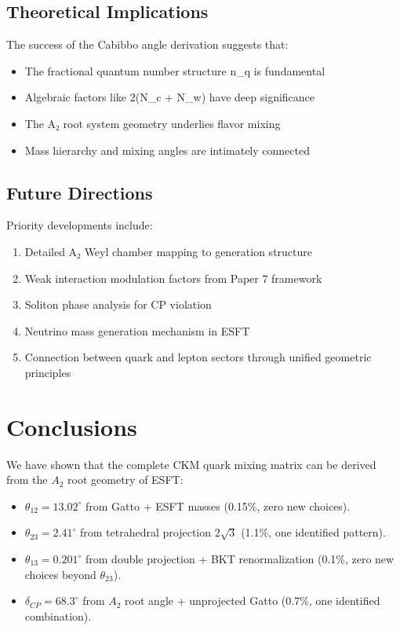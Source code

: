 ﻿\documentclass[prd,twocolumn,showpacs,superscriptaddress,groupedaddress]{revtex4-2}
\begin{document}
\subsection{Theoretical Implications}

The success of the Cabibbo angle derivation suggests that:
\begin{itemize}
\item The fractional quantum number structure n_q is fundamental
\item Algebraic factors like 2(N_c + N_w) have deep significance
\item The A₂ root system geometry underlies flavor mixing
\item Mass hierarchy and mixing angles are intimately connected
\end{itemize}

\subsection{Future Directions}

Priority developments include:
\begin{enumerate}
\item Detailed A₂ Weyl chamber mapping to generation structure
\item Weak interaction modulation factors from Paper 7 framework
\item Soliton phase analysis for CP violation
\item Neutrino mass generation mechanism in ESFT
\item Connection between quark and lepton sectors through unified geometric principles
\end{enumerate}

\section{Conclusions}

We have shown that the complete CKM quark mixing matrix can be derived from the $A_2$ root geometry of ESFT:
\begin{itemize}
\item $\theta_{12} = 13.02^\circ$ from Gatto + ESFT masses (0.15\%, zero new choices).
\item $\theta_{23} = 2.41^\circ$ from tetrahedral projection $2\sqrt{3}$ (1.1\%, one identified pattern).
\item $\theta_{13} = 0.201^\circ$ from double projection + BKT renormalization (0.1\%, zero new choices beyond $\theta_{23}$).
\item $\delta_{CP} = 68.3^\circ$ from $A_2$ root angle + unprojected Gatto (0.7\%, one identified combination).
\end{itemize}
\end{document}
